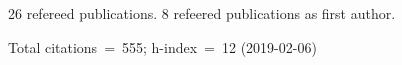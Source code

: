26 refereed publications. 8 refeered publications as first author.

Total citations~=~555; h-index~=~12 (2019-02-06)